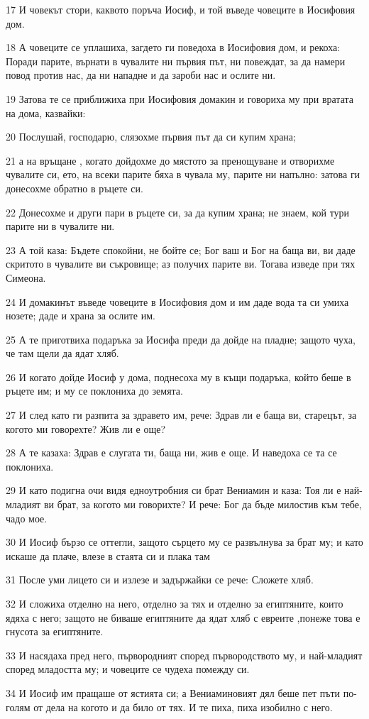 \par 17 И човекът стори, каквото поръча Иосиф, и той въведе човеците в Иосифовия дом.
\par 18 А човеците се уплашиха, загдето ги поведоха в Иосифовия дом, и рекоха: Поради парите, върнати в чувалите ни първия път, ни повеждат, за да намери повод против нас, да ни нападне и да зароби нас и ослите ни.
\par 19 Затова те се приближиха при Иосифовия домакин и говориха му при вратата на дома, казвайки:
\par 20 Послушай, господарю, слязохме първия път да си купим храна;
\par 21 а на връщане , когато дойдохме до мястото за пренощуване и отворихме чувалите си, ето, на всеки парите бяха в чувала му, парите ни напълно: затова ги донесохме обратно в ръцете си.
\par 22 Донесохме и други пари в ръцете си, за да купим храна; не знаем, кой тури парите ни в чувалите ни.
\par 23 А той каза: Бъдете спокойни, не бойте се; Бог ваш и Бог на баща ви, ви даде скритото в чувалите ви съкровище; аз получих парите ви. Тогава изведе при тях Симеона.
\par 24 И домакинът въведе човеците в Иосифовия дом и им даде вода та си умиха нозете; даде и храна за ослите им.
\par 25 А те приготвиха подаръка за Иосифа преди да дойде на пладне; защото чуха, че там щели да ядат хляб.
\par 26 И когато дойде Иосиф у дома, поднесоха му в къщи подаръка, който беше в ръцете им; и му се поклониха до земята.
\par 27 И след като ги разпита за здравето им, рече: Здрав ли е баща ви, старецът, за когото ми говорехте? Жив ли е още?
\par 28 А те казаха: Здрав е слугата ти, баща ни, жив е още. И наведоха се та се поклониха.
\par 29 И като подигна очи видя едноутробния си брат Вениамин и каза: Тоя ли е най-младият ви брат, за когото ми говорихте? И рече: Бог да бъде милостив към тебе, чадо мое.
\par 30 И Иосиф бързо се оттегли, защото сърцето му се развълнува за брат му; и като искаше да плаче, влезе в стаята си и плака там
\par 31 После уми лицето си и излезе и задържайки се рече: Сложете хляб.
\par 32 И сложиха отделно на него, отделно за тях и отделно за египтяните, които ядяха с него; защото не биваше египтяните да ядат хляб с евреите ,понеже това е гнусота за египтяните.
\par 33 И насядаха пред него, първородният според първородството му, и най-младият според младостта му; и човеците се чудеха помежду си.
\par 34 И Иосиф им пращаше от ястията си; а Вениаминовият дял беше пет пъти по-голям от дела на когото и да било от тях. И те пиха, пиха изобилно с него.

